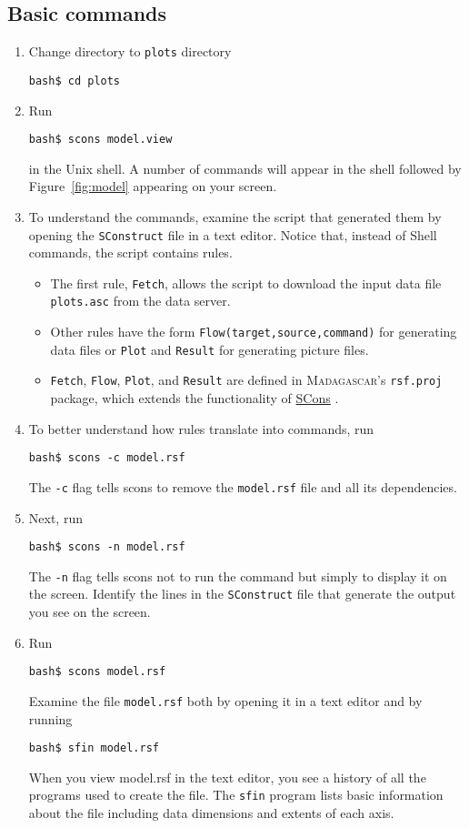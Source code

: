 \subsection{Basic commands}
\begin{enumerate}
\item Change directory to \texttt{plots} directory
\begin{verbatim}
bash$ cd plots
\end{verbatim}
\item Run
\begin{verbatim}
bash$ scons model.view
\end{verbatim}

in the Unix shell. A number of commands will appear in the shell
followed by Figure~\ref{fig:model} appearing on your screen.
\item To understand the commands, examine the script that generated them by 
opening the \texttt{SConstruct} file in a text editor. Notice that,
instead of Shell commands, the script contains rules.
\begin{itemize}
\item The first rule, \texttt{Fetch}, allows the script to download the 
input data file \texttt{plots.asc} from the data server.
\item Other rules have the form \texttt{Flow(target,source,command)} for
generating data files or \texttt{Plot} and \texttt{Result} for
generating picture files.
\item \texttt{Fetch}, \texttt{Flow}, \texttt{Plot}, and \texttt{Result} 
are defined in \textsc{Madagascar}'s \texttt{rsf.proj} package, which
extends the functionality of \href{http://www.scons.org}{SCons} .
\end{itemize}
\item To better understand how rules translate into commands, run 
\begin{verbatim}
bash$ scons -c model.rsf
\end{verbatim}
The \texttt{-c} flag tells scons to remove the \texttt{model.rsf} file
and all its dependencies.
\item Next, run
\begin{verbatim}
bash$ scons -n model.rsf
\end{verbatim}
The \texttt{-n} flag tells scons not to run the command but simply to
display it on the screen. Identify the lines in
the \texttt{SConstruct} file that generate the output you see on the
screen.
\item Run
\begin{verbatim}
bash$ scons model.rsf
\end{verbatim}
  Examine the file \texttt{model.rsf} both by opening it in a text
  editor and by running
\begin{verbatim}
bash$ sfin model.rsf
\end{verbatim}

  When you view model.rsf in the text editor, you see a history of all
  the programs used to create the file. The \texttt{sfin} program
  lists basic information about the file including data dimensions and
  extents of each axis.
\end{enumerate}

